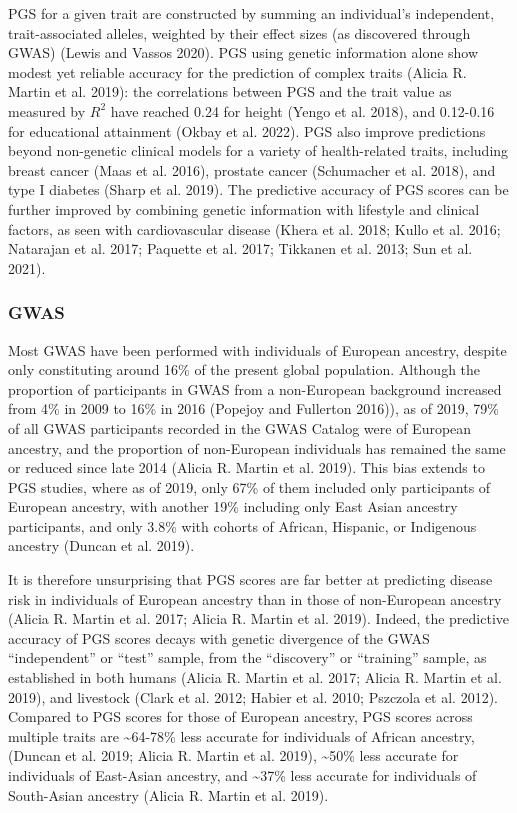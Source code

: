\documentclass[
]{book}
\begin{document}
PGS for a given trait are constructed by summing an individual's independent, trait-associated alleles, weighted by their effect sizes (as discovered through GWAS) (Lewis and Vassos 2020). PGS using genetic information alone show modest yet reliable accuracy for the prediction of complex traits (Alicia R. Martin et al. 2019): the correlations between PGS and the trait value as measured by \(R^2\) have reached 0.24 for height (Yengo et al. 2018), and 0.12-0.16 for educational attainment (Okbay et al. 2022). PGS also improve predictions beyond non-genetic clinical models for a variety of health-related traits, including breast cancer (Maas et al. 2016), prostate cancer (Schumacher et al. 2018), and type I diabetes (Sharp et al. 2019). The predictive accuracy of PGS scores can be further improved by combining genetic information with lifestyle and clinical factors, as seen with cardiovascular disease (Khera et al. 2018; Kullo et al. 2016; Natarajan et al. 2017; Paquette et al. 2017; Tikkanen et al. 2013; Sun et al. 2021).

\hypertarget{gwas}{%
\subsubsection{GWAS}\label{gwas}}

Most GWAS have been performed with individuals of European ancestry, despite only constituting around 16\% of the present global population. Although the proportion of participants in GWAS from a non-European background increased from 4\% in 2009 to 16\% in 2016 (Popejoy and Fullerton 2016)), as of 2019, 79\% of all GWAS participants recorded in the GWAS Catalog were of European ancestry, and the proportion of non-European individuals has remained the same or reduced since late 2014 (Alicia R. Martin et al. 2019). This bias extends to PGS studies, where as of 2019, only 67\% of them included only participants of European ancestry, with another 19\% including only East Asian ancestry participants, and only 3.8\% with cohorts of African, Hispanic, or Indigenous ancestry (Duncan et al. 2019).

It is therefore unsurprising that PGS scores are far better at predicting disease risk in individuals of European ancestry than in those of non-European ancestry (Alicia R. Martin et al. 2017; Alicia R. Martin et al. 2019). Indeed, the predictive accuracy of PGS scores decays with genetic divergence of the GWAS ``independent'' or ``test'' sample, from the ``discovery'' or ``training'' sample, as established in both humans (Alicia R. Martin et al. 2017; Alicia R. Martin et al. 2019), and livestock (Clark et al. 2012; Habier et al. 2010; Pszczola et al. 2012). Compared to PGS scores for those of European ancestry, PGS scores across multiple traits are \textasciitilde64-78\% less accurate for individuals of African ancestry, (Duncan et al. 2019; Alicia R. Martin et al. 2019), \textasciitilde50\% less accurate for individuals of East-Asian ancestry, and \textasciitilde37\% less accurate for individuals of South-Asian ancestry (Alicia R. Martin et al. 2019).
\end{document}
